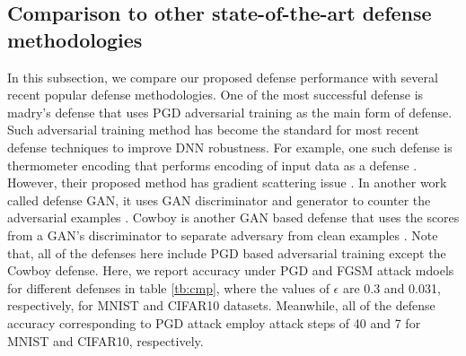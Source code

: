 \documentclass{article}
\begin{document}
\subsection{Comparison to other state-of-the-art defense methodologies}

In this subsection, we compare our proposed defense performance with several recent popular defense methodologies. One of the most successful defense is madry's defense \cite{madry2017towards} that uses PGD adversarial training as the main form of defense. Such adversarial training method has become the standard for most recent defense techniques to improve DNN robustness. For example, one such defense is thermometer encoding that performs encoding of input data as a defense \cite{buckman2018thermometer}. However, their proposed method has gradient scattering issue \cite{athalye2018obfuscated}. In another work called defense GAN, it uses GAN discriminator and generator to counter the adversarial examples \cite{samangouei2018defense}. Cowboy is another GAN based defense that uses the scores from a GAN's discriminator to separate adversary from clean examples \cite{santhanam2018defending}. Note that, all of the defenses here include PGD based adversarial training except the Cowboy defense. Here, we report accuracy under PGD and FGSM attack mdoels for different defenses in table \ref{tb:cmp}, where the values of $\epsilon$ are 0.3 and 0.031, respectively, for MNIST and CIFAR10 datasets. Meanwhile, all of the defense accuracy corresponding to PGD attack employ attack steps of 40 and 7 for MNIST and CIFAR10, respectively.
\end{document}
